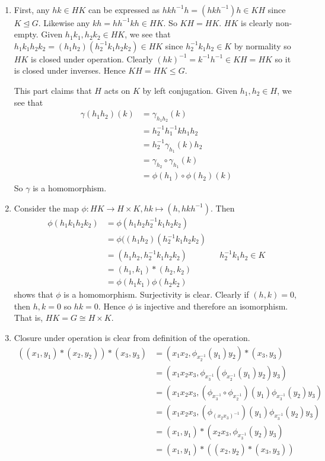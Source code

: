 \documentclass[12pt]{article}
\begin{document}
\begin{problem}[5]
~\begin{enumerate}[label=(\alph*)]
	\item First, any $ hk \in HK$ can be expressed as $ hkh^{-1}h = (hkh^{-1})h \in KH$ since $ K \trianglelefteq G$. Likewise any $ kh = hh^{-1}kh \in HK$. So $ KH=HK$. $ HK$ is clearly non-empty. Given  $ h_1k_1,h_2k_2 \in HK$, we see that $ h_1 k_1 h_2 k_2 = (h_1 h_2) (h_2^{-1} k_1 h_2 k_2) \in HK$ since $ h_2 ^{-1} k_1 h_2 \in K$ by normality so $ HK$ is closed under operation. Clearly $ (hk)^{-1} = k^{-1}h^{-1} \in KH = HK$ so it is closed under inverses. Hence $ KH=HK \leq G$.

		This part claims that $ H$ acts on $ K$ by left conjugation. Given $ h_1 , h_2 \in H$, we see that
		\begin{align*}
			 \gamma(h_1 h_2) (k) &= \gamma_{h_1 h_2} (k) \\
			 &= h_2^{-1}h_1^{-1} k h_1 h_2 \\
			 &= h_2 ^{-1} \gamma_{h_1}(k) h_2\\
			 &= \gamma_{h_2} \circ \gamma_{h_1}(k) \\
			 &= \phi(h_1) \circ \phi(h_2) (k) 
		\end{align*}
		So $ \gamma$ is a homomorphism.
	\item Consider the map $ \phi: HK \to H \times K,hk \mapsto (h,hkh^{-1})$. Then
		\begin{align*}
			\phi(h_1 k_1 h_2 k_2) &= \phi(h_1 h_2 h_2^{-1} k_1 h_2 k_2) \\
			&= \phi((h_1h_2)(h_2^{-1}k_1h_2k_2) \\
			&= (h_1h_2,h_2^{-1} k_1 h_2 k_2) && h_2^{-1}k_1 h_2 \in K\\
			&= (h_1, k_1) * (h_2, k_2) \\
			&= \phi(h_1k_1) \phi(h_2k_2)
		\end{align*}
		shows that $ \phi$ is a homomorphism. Surjectivity is clear. Clearly if $ (h,k)=0$, then  $ h,k=0$ so  $ hk=0$. Hence  $ \phi$ is injective and therefore an isomorphism. That is, $HK= G \cong H \times K$.
	\item Closure under operation is clear from definition of the operation. 
		\begin{align*}
			((x_1,y_1) * (x_2,y_2))*(x_3,y_3) &= (x_1x_2,\phi_{x_2^{-1}}(y_1)y_2)*(x_3,y_3) \\
			&= (x_1x_2x_3,\phi_{x_3^{-1}}(\phi_{x_2^{-1}}(y_1)y_2)y_3) \\
			&= (x_1x_2x_3, (\phi_{x_3^{-1}} \circ \phi_{x_2^{-1}}) (y_1) \phi_{x_3^{-1}}(y_2)y_3) \\
			&= (x_1x_2x_3, (\phi_{(x_2x_3)^{-1} }) (y_1) \phi_{x_3^{-1}}(y_2)y_3) \\
			&= (x_1,y_1)*(x_2x_3,\phi_{x_3^{-1}}(y_2)y_3) \\
			&=(x_1,y_1) * ((x_2,y_2)*(x_3,y_3))
		\end{align*}


\end{enumerate}
\end{problem}
\end{document}

